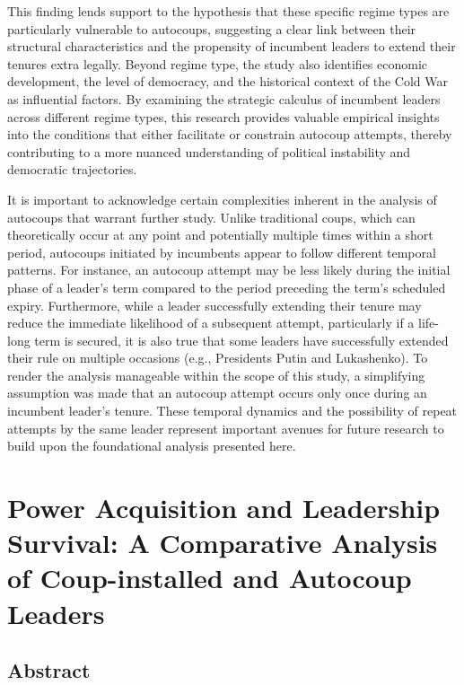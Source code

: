 \documentclass[
  12pt,
]{report}
\begin{document}
This finding lends support to the hypothesis that these specific regime
types are particularly vulnerable to autocoups, suggesting a clear link
between their structural characteristics and the propensity of incumbent
leaders to extend their tenures extra legally. Beyond regime type, the
study also identifies economic development, the level of democracy, and
the historical context of the Cold War as influential factors. By
examining the strategic calculus of incumbent leaders across different
regime types, this research provides valuable empirical insights into
the conditions that either facilitate or constrain autocoup attempts,
thereby contributing to a more nuanced understanding of political
instability and democratic trajectories.

It is important to acknowledge certain complexities inherent in the
analysis of autocoups that warrant further study. Unlike traditional
coups, which can theoretically occur at any point and potentially
multiple times within a short period, autocoups initiated by incumbents
appear to follow different temporal patterns. For instance, an autocoup
attempt may be less likely during the initial phase of a leader's term
compared to the period preceding the term's scheduled expiry.
Furthermore, while a leader successfully extending their tenure may
reduce the immediate likelihood of a subsequent attempt, particularly if
a life-long term is secured, it is also true that some leaders have
successfully extended their rule on multiple occasions (e.g., Presidents
Putin and Lukashenko). To render the analysis manageable within the
scope of this study, a simplifying assumption was made that an autocoup
attempt occurs only once during an incumbent leader's tenure. These
temporal dynamics and the possibility of repeat attempts by the same
leader represent important avenues for future research to build upon the
foundational analysis presented here.

\chapter{Power Acquisition and Leadership Survival: A Comparative
Analysis of Coup-installed and Autocoup
Leaders}\label{power-acquisition-and-leadership-survival-a-comparative-analysis-of-coup-installed-and-autocoup-leaders}

\section*{Abstract}\label{abstract-3}
\end{document}
